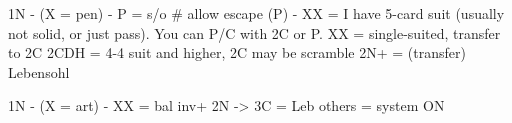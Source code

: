 1N - (X = pen) -
P = s/o  # allow escape
    (P) - XX = I have 5-card suit (usually not solid, or just pass). You can P/C with 2C or P.
XX = single-suited, transfer to 2C
2CDH = 4-4 suit and higher, 2C may be scramble
2N+ = (transfer) Lebensohl

1N - (X = art) - 
XX = bal inv+
2N -> 3C = Leb
others = system ON 